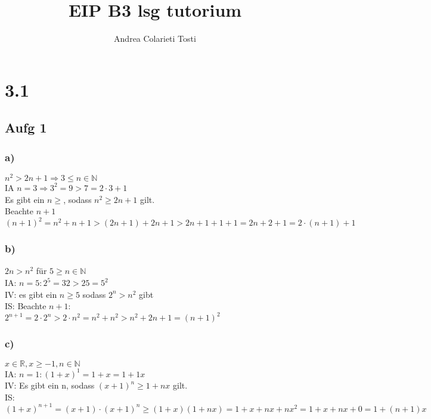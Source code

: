\documentclass[12pt,a4paper]{article}
\author{Andrea Colarieti Tosti}
\title{EIP B3 lsg tutorium}
\begin{document}
\maketitle
\section{3.1}
\subsection{Aufg 1}
\subsubsection{a)}
$ n^2 > 2n+1 \Rightarrow 3 \leq n \in \mathbb{N}$\\
IA $ n = 3  \Rightarrow 3^2=9 > 7 = 2 \cdot 3 +1 $ \\
Es gibt ein $n \geq $, sodass $n^2 \geq 2n+1$ gilt. \\
Beachte $n+1$ \\
$(n+1)^2 = n^2+n+1 > (2n+1) +2n+1 > 2n+1 +1+1 = 2n+2+1 = 2 \cdot (n+1)+1$
\subsubsection{b)}
$2n> n^2 $ für $5 \geq n \in \mathbb{N}$ \\
IA: $ n = 5 : 2^5 = 32 > 25 = 5^2 $\\
IV:  es gibt ein $ n \geq5 $  sodass $ 2^n > n^2$ gibt\\
IS: Beachte $n+1$:\\
$ 2^{n+1} = 2 \cdot 2^n > 2\cdot n^2 = n^2 + n^2 > n^2+2n+1 = (n+1)^2$\\
\subsubsection{c)}
$ x \in \mathbb{R}, x \geq -1, n\in \mathbb{N}$\\
IA: $n=1 : (1+x)^1= 1+x = 1+1x$\\
IV: Es gibt ein n, sodass $ (x+1)^n \geq 1+nx$ gilt.\\
IS: $ (1+x)^{n+1} = (x+1)\cdot (x+1)^n \geq (1+x)(1+nx) = 1+x+nx+nx^2 = 1+x+nx+0 = 1+(n+1)x$
\end{document}
